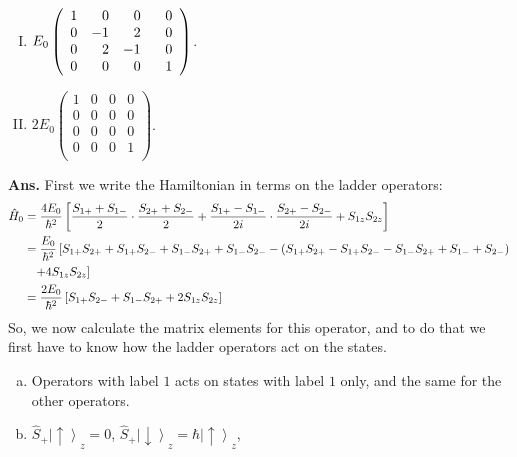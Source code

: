 \documentclass[12pt]{article}
\begin{document}
\begin{enumerate}[1.]
\begin{enumerate}[I.]
              \item $E_0 \left( \begin{array}{crrr}
                                   1& 0 & 0 & 0 \\
                                   0 & -1 & 2 & 0 \\
                                   0 & 2 & -1 & 0 \\
                                   0 & 0 & 0 & \hphantom{-}1 \\
                                   \end{array}\right)$.
              \item $2 E_0 \left( \begin{array}{cccc}
                            1 & 0 & 0 & 0 \\
                            0 & 0 & 0 & 0 \\
                            0 & 0 & 0 & 0 \\
                            0 & 0 & 0 & 1 \\
                            \end{array}\right)$. \\ \newline
       \end{enumerate}
\textbf{Ans.} First we write the Hamiltonian in terms on the ladder operators:
$$\begin{aligned}
\hat{H}_0 & = \frac{4 E_0}{\hbar ^2} \left[\frac{S_{1+} + S_{1-}}{2}\cdot \frac{S_{2+} + S_{2-}}{2} + \frac{S_{1+} - S_{1-}}{2i} \cdot \frac{S_{2+} - S_{2-}}{2i} + S_{1z}S_{2z}\right] \\
& = \frac{E_0}{\hbar^2}\left[S_{1+}S_{2+}+S_{1+}S_{2-}+S_{1-}S_{2+}+S_{1-}S_{2-} - \left( S_{1+}S_{2+}-S_{1+}S_{2-}-S_{1-}S_{2+}+S_{1-}+S_{2-} \right) \right. \\ & \hphantom{=} \left. + 4 S_{1z}S_{2z}\right] \\
& = \frac{2 E_0}{\hbar^2} \left[S_{1+}S_{2-} + S_{1-}S_{2+} + 2 S_{1z}S_{2z}\right]
\end{aligned}
$$
\newpage
So, we now calculate the matrix elements for this operator, and to do that we first have to know how the ladder operators act on the states.
       \begin{enumerate}[a.]
              \item Operators with label $1$ acts on states with label $1$ only, and the same for the other operators.
              \item $\hat{S}_{+} \left | \uparrow \right \rangle _z = 0$, \phantom{Hello!W} $\hat{S}_{+} \left | \downarrow \right \rangle _z = \hbar \left | \uparrow \right \rangle _z$, \newline

\end{enumerate}
\end{enumerate}
\end{document}
